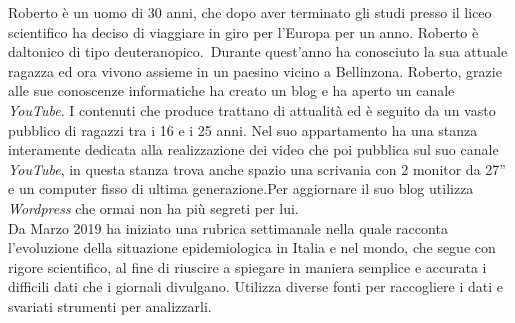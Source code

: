 Roberto è un uomo di 30 anni, che dopo aver terminato gli studi presso il liceo scientifico ha deciso di viaggiare in giro per l'Europa per un anno. Roberto è daltonico di tipo deuteranopico. Durante quest'anno ha conosciuto la sua attuale ragazza ed ora vivono assieme in un paesino vicino a Bellinzona. Roberto, grazie alle sue conoscenze informatiche ha creato un blog e ha aperto un canale \textit{YouTube}. I contenuti che produce trattano di attualità ed è seguito da un vasto pubblico di ragazzi tra i 16 e i 25 anni. Nel suo appartamento ha una stanza interamente dedicata alla realizzazione dei video che poi pubblica sul suo canale \textit{YouTube}, in questa stanza trova anche spazio una scrivania con 2 monitor da 27'' e un computer fisso di ultima generazione.Per aggiornare il suo blog utilizza \textit{Wordpress} che ormai non ha più segreti per lui.\\ 
Da Marzo 2019 ha iniziato una rubrica settimanale nella quale racconta l'evoluzione della situazione epidemiologica in Italia e nel mondo, che segue con rigore scientifico, al fine di riuscire a spiegare in maniera semplice e accurata i difficili dati che i giornali divulgano. Utilizza diverse fonti per raccogliere i dati e svariati strumenti per analizzarli. 

